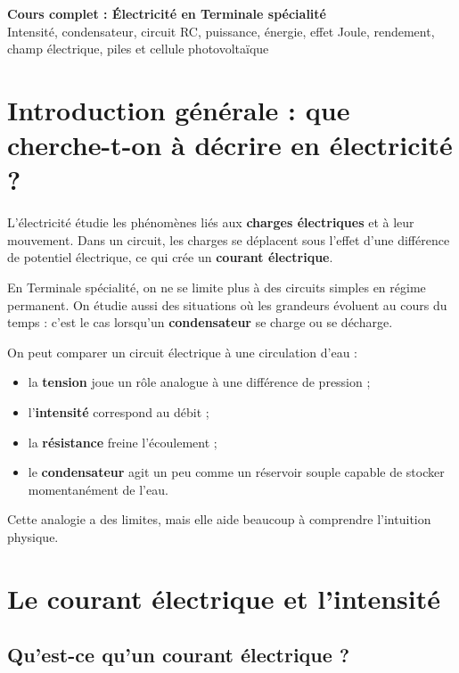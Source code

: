 \documentclass[11pt,a4paper]{article}
\begin{document}
\begin{center}
    {\LARGE \textbf{Cours complet : Électricité en Terminale spécialité}}\\[0.4cm]
    {\large Intensité, condensateur, circuit RC, puissance, énergie, effet Joule, rendement, champ électrique, piles et cellule photovoltaïque}
\end{center}

\vspace{0.4cm}

\tableofcontents

\newpage

\section{Introduction générale : que cherche-t-on à décrire en électricité ?}

L'électricité étudie les phénomènes liés aux \textbf{charges électriques} et à leur mouvement. Dans un circuit, les charges se déplacent sous l'effet d'une différence de potentiel électrique, ce qui crée un \textbf{courant électrique}. 

En Terminale spécialité, on ne se limite plus à des circuits simples en régime permanent. On étudie aussi des situations où les grandeurs évoluent au cours du temps : c'est le cas lorsqu'un \textbf{condensateur} se charge ou se décharge.

\begin{analogie}
On peut comparer un circuit électrique à une circulation d'eau :
\begin{itemize}
    \item la \textbf{tension} joue un rôle analogue à une différence de pression ;
    \item l'\textbf{intensité} correspond au débit ;
    \item la \textbf{résistance} freine l'écoulement ;
    \item le \textbf{condensateur} agit un peu comme un réservoir souple capable de stocker momentanément de l'eau.
\end{itemize}
Cette analogie a des limites, mais elle aide beaucoup à comprendre l'intuition physique.
\end{analogie}

\section{Le courant électrique et l'intensité}

\subsection{Qu'est-ce qu'un courant électrique ?}
\end{document}
